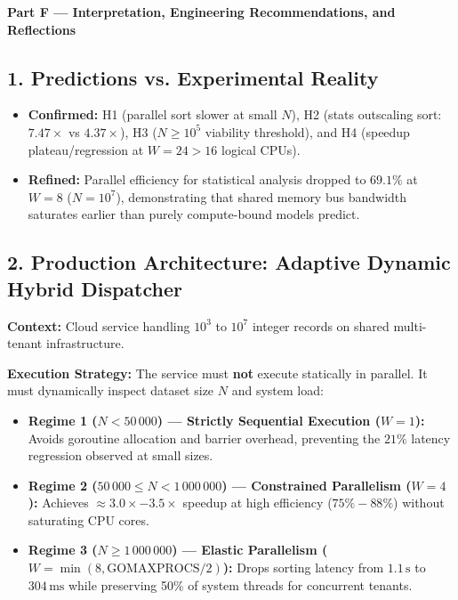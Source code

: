 \documentclass[11pt]{article}
\begin{document}
\newpage

{\centering\fontsize{14}{17}\selectfont\textbf{Part F --- Interpretation, Engineering Recommendations, and Reflections}\par}
\vspace{0.4em}
\enlargethispage{3.0\baselineskip}

\subsection*{1. Predictions vs. Experimental Reality}
\begin{itemize}
    \item \textbf{Confirmed:} H1 (parallel sort slower at small $N$), H2 (stats outscaling sort: $7.47\times$ vs $4.37\times$), H3 ($N \ge 10^5$ viability threshold), and H4 (speedup plateau/regression at $W=24 > 16$ logical CPUs).
    \item \textbf{Refined:} Parallel efficiency for statistical analysis dropped to $69.1\%$ at $W=8$ ($N=10^7$), demonstrating that shared memory bus bandwidth saturates earlier than purely compute-bound models predict.
\end{itemize}

\subsection*{2. Production Architecture: Adaptive Dynamic Hybrid Dispatcher}
\noindent\textbf{Context:} Cloud service handling $10^3$ to $10^7$ integer records on shared multi-tenant infrastructure.

\noindent\textbf{Execution Strategy:} The service must \textbf{not} execute statically in parallel. It must dynamically inspect dataset size $N$ and system load:
\begin{itemize}[itemsep=0.2em]
    \item \textbf{Regime 1 ($N < 50\,000$) --- Strictly Sequential Execution ($W = 1$):} Avoids goroutine allocation and barrier overhead, preventing the $21\%$ latency regression observed at small sizes.
    \item \textbf{Regime 2 ($50\,000 \le N < 1\,000\,000$) --- Constrained Parallelism ($W = 4$):} Achieves $\approx 3.0\times - 3.5\times$ speedup at high efficiency ($75\% - 88\%$) without saturating CPU cores.
    \item \textbf{Regime 3 ($N \ge 1\,000\,000$) --- Elastic Parallelism ($W = \min(8, \text{GOMAXPROCS}/2)$):} Drops sorting latency from $1.1\,\text{s}$ to $304\,\text{ms}$ while preserving 50\% of system threads for concurrent tenants.
\end{itemize}
\end{document}

